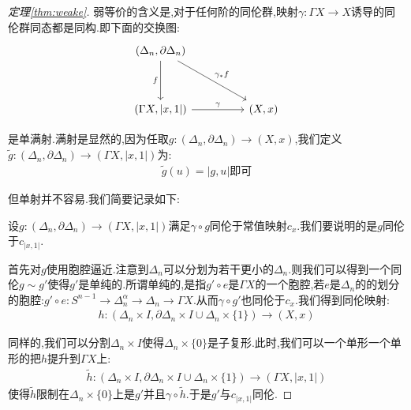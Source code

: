 \begin{proof}[定理\ref{thm:weake}]
    弱等价的含义是,对于任何阶的同伦群,映射$\gamma:\Gamma X \to X$诱导的同伦群同态都是同构.即下面的交换图:
    \[\begin{tikzcd}
	{(\Delta_n,\partial \Delta_n)} \\
	\\
	{(\Gamma X,|x,1|)} && {(X,x)}
	\arrow["f"', from=1-1, to=3-1]
	\arrow["\gamma", from=3-1, to=3-3]
	\arrow["{\gamma_*f}", from=1-1, to=3-3]
    \end{tikzcd}
    \]

    是单满射.满射是显然的,因为任取$g:(\Delta_n,\partial \Delta_n) \to (X,x)$,我们定义$\tilde{g}:(\Delta_n,\partial \Delta_n) \to (\Gamma X,|x,1|)$为:
    \begin{align*}
        \tilde{g}(u)=|g,u| \text{即可}
    \end{align*} 

    但单射并不容易.我们简要记录如下:
    
    设$g:(\Delta_n,\partial \Delta_n) \to (\Gamma X,|x,1|)$满足$\gamma \circ g$同伦于常值映射$c_x$.我们要说明的是$g$同伦于$c_{|x,1|}$.

    首先对$g$使用胞腔逼近.注意到$\Delta_n$可以分划为若干更小的$\Delta_n$.则我们可以得到一个同伦$g \sim g'$使得$g'$是单纯的.所谓单纯的,是指$g'\circ e$是$\Gamma X$的一个胞腔,若$e$是$\Delta_n$的的划分的胞腔:$g'\circ e:S^{n-1} \to \Delta_n^\alpha \to \Delta_n \to \Gamma X$.从而$\gamma \circ g'$也同伦于$c_x$.我们得到同伦映射:
    \begin{align*}
        h:(\Delta_n\times I,\partial \Delta_n \times I\cup \Delta_n \times \{1\}) \to (X,x)
    \end{align*}
    
    同样的,我们可以分割$\Delta_n \times I$使得$\Delta_n \times \{0\}$是子复形.此时,我们可以一个单形一个单形的把$h$提升到$\Gamma X$上:
     \begin{align*}
        \tilde{h}:(\Delta_n\times I,\partial \Delta_n \times I\cup \Delta_n \times \{1\}) \to (\Gamma X,|x,1|)
    \end{align*}
    使得$\tilde{h}$限制在$\Delta_n \times \{0\}$上是$g'$并且$\gamma \circ \tilde{h}$.于是$g'$与$c_{|x,1|}$同伦.
\end{proof}

